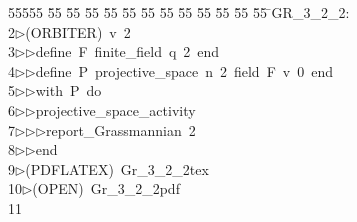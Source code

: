 %
%
\begin{tabbing}
55555 \= 55 \= 55 \= 55 \= 55 \= 55 \= 55 \= 55 \= 55 \= 55 \= 55 \= 55 \= 55 \= \>GR\_3\_2\_2:\\[0pt]
2\>$\triangleright$\>(ORBITER)\ v\ 2\ \\[0pt]
3\>$\triangleright$\>$\triangleright$\>define\ F\ finite\_field\ q\ 2\ end\ \\[0pt]
4\>$\triangleright$\>$\triangleright$\>define\ P\ projective\_space\ n\ 2\ field\ F\ v\ 0\ end\ \\[0pt]
5\>$\triangleright$\>$\triangleright$\>with\ P\ do\ \\[0pt]
6\>$\triangleright$\>$\triangleright$\>projective\_space\_activity\ \\[0pt]
7\>$\triangleright$\>$\triangleright$\>$\triangleright$\>report\_Grassmannian\ 2\ \\[0pt]
8\>$\triangleright$\>$\triangleright$\>end\\[0pt]
9\>$\triangleright$\>(PDFLATEX)\ Gr\_3\_2\_2tex\ \\[0pt]
10\>$\triangleright$\>(OPEN)\ Gr\_3\_2\_2pdf\\[0pt]
11\>\end{tabbing}
